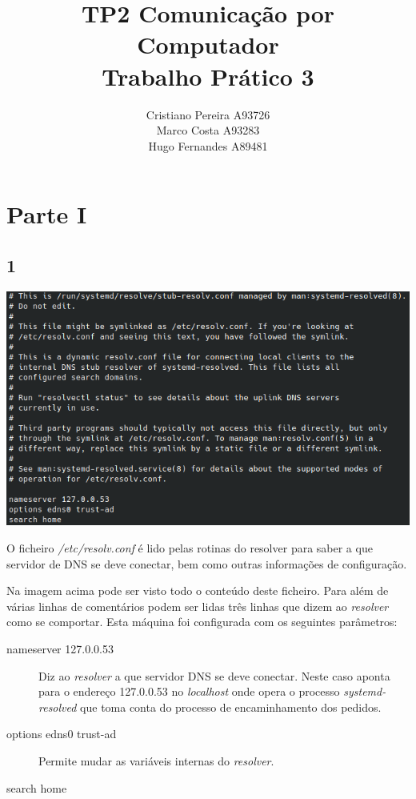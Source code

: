 \documentclass[size=11pt]{report}
\title{TP2}
\title{
    Comunicação por Computador \\
    \large{Trabalho Prático 3}
}
\author{
    Cristiano Pereira A93726 \\
    Marco Costa A93283 \\
    Hugo Fernandes A89481
}
\affil{
    Universidade do Minho \\
    Departamento de Informática
}
\begin{document}
    \maketitle
    \newpage

    \section*{Parte I}
        \subsection*{1}
            \noindent
            \includegraphics[width=\textwidth]{images/resolv.conf.png}
            \par
                O ficheiro \textit{/etc/resolv.conf} é lido pelas rotinas do resolver para saber
            a que servidor de DNS se deve conectar, bem como outras informações de configuração.\par 
                Na imagem acima pode ser visto todo o conteúdo deste ficheiro. Para além de várias linhas de comentários
            podem ser lidas três linhas que dizem ao \textit{resolver} como se comportar. Esta máquina foi configurada com os seguintes parâmetros: 
            \begin{description}
                \item[nameserver 127.0.0.53] Diz ao \textit{resolver} a que servidor DNS se deve conectar. Neste caso aponta para o endereço 127.0.0.53 no
                \textit{localhost} onde opera o processo \textit{systemd-resolved} que toma conta do processo de encaminhamento dos pedidos.
                \item[options edns0 trust-ad] Permite mudar as variáveis internas do \textit{resolver}.
                \item[search home]   
            \end{description}
            \pagebreak
\end{document}
